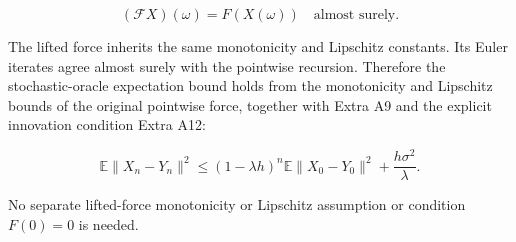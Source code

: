 \documentclass[11pt,a4paper]{report}
\begin{document}
\[(\mathscr F X)(\omega)=F(X(\omega))\quad\text{almost surely}.\]



The lifted force inherits the same monotonicity and Lipschitz constants. Its Euler iterates agree almost surely with the pointwise recursion. Therefore the stochastic-oracle expectation bound holds from the monotonicity and Lipschitz bounds of the original pointwise force, together with Extra A9 and the explicit innovation condition Extra A12:



\[\mathbb E\|X_n-Y_n\|^2\le(1-\lambda h)^n\mathbb E\|X_0-Y_0\|^2+\frac{h\sigma^2}{\lambda}.\]



No separate lifted-force monotonicity or Lipschitz assumption or condition \(F(0)=0\) is needed.
\end{document}

